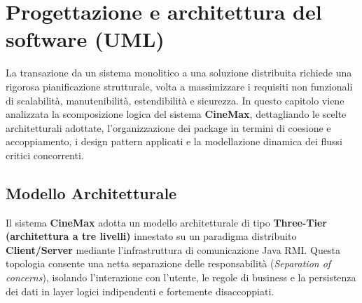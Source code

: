 \documentclass[12pt, a4paper]{article}
\begin{document}
\section{Progettazione e architettura del software (UML)}
La transazione da un sistema monolitico a una soluzione distribuita richiede una rigorosa pianificazione strutturale, volta a massimizzare i requisiti non funzionali di scalabilità, manutenibilità, estendibilità e sicurezza. In questo capitolo viene analizzata la scomposizione logica del sistema \textbf{CineMax}, dettagliando le scelte architetturali adottate, l'organizzazione dei package in termini di coesione e accoppiamento, i design pattern applicati e la modellazione dinamica dei flussi critici concorrenti.

\subsection{Modello Architetturale} 
Il sistema \textbf{CineMax} adotta un modello architetturale di tipo \textbf{Three-Tier (architettura a tre livelli)} innestato su un paradigma distribuito \textbf{Client/Server} mediante l'infrastruttura di comunicazione Java RMI. Questa topologia consente una netta separazione delle responsabilità (\textit{Separation of concerns}), isolando l'interazione con l'utente, le regole di business e la persistenza dei dati in layer logici indipendenti e fortemente disaccoppiati.
\end{document}
